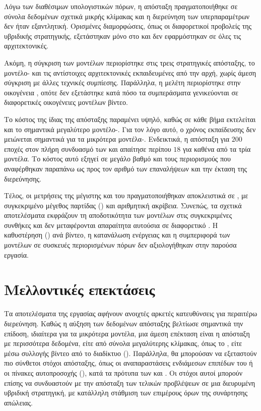 Λόγω των διαθέσιμων υπολογιστικών πόρων, η απόσταξη πραγματοποιήθηκε σε
σύνολα δεδομένων σχετικά μικρής κλίμακας και η διερεύνηση των
υπερπαραμέτρων δεν ήταν εξαντλητική. Ορισμένες διαμορφώσεις, όπως οι
διαφορετικοί προβολείς της υβριδικής στρατηγικής, εξετάστηκαν μόνο στο
 και δεν εφαρμόστηκαν σε όλες τις αρχιτεκτονικές.

Ακόμη, η σύγκριση των μοντέλων περιορίστηκε στις τρεις στρατηγικές
απόσταξης, το μοντέλο- και τις αντίστοιχες αρχιτεκτονικές
εκπαιδευμένες από την αρχή, χωρίς άμεση σύγκριση με άλλες τεχνικές
συμπίεσης. Παράλληλα, η μελέτη περιορίστηκε στην οικογένεια
, οπότε δεν εξετάστηκε κατά πόσο τα συμπεράσματα
γενικεύονται σε διαφορετικές οικογένειες μοντέλων βίντεο.

Το κόστος της ίδιας της απόσταξης παραμένει υψηλό, καθώς σε κάθε βήμα
εκτελείται και το σημαντικά μεγαλύτερο μοντέλο-. Για τον
λόγο αυτό, ο χρόνος εκπαίδευσης δεν μειώνεται σημαντικά για τα μικρότερα
μοντέλα-. Ενδεικτικά, η απόσταξη για \(200\) εποχές στον
πλήρη συνδυασμό των  και  απαίτησε περίπου
\(18\) για καθένα από τα τρία μοντέλα.
Το κόστος αυτό εξηγεί σε μεγάλο βαθμό και τους περιορισμούς που
αναφέρθηκαν παραπάνω ως προς τον αριθμό των επαναλήψεων και την
έκταση της διερεύνησης.

Τέλος, οι μετρήσεις της μέγιστης  και του 
πραγματοποιήθηκαν αποκλειστικά σε , με συγκεκριμένο
μέγεθος παρτίδας () και αριθμητική ακρίβεια. Συνεπώς, τα σχετικά
αποτελέσματα εκφράζουν τη αποδοτικότητα των μοντέλων στις
συγκεκριμένες συνθήκες και δεν μεταφέρονται απαραίτητα αυτούσια σε
διαφορετικό . Η καθυστέρηση () ανά βίντεο, η κατανάλωση ενέργειας και η
συμπεριφορά των μοντέλων σε συσκευές περιορισμένων πόρων δεν
αξιολογήθηκαν στην παρούσα εργασία.

\section{Μελλοντικές επεκτάσεις}
\label{sec:conclusions-future}

Τα αποτελέσματα της εργασίας αφήνουν ανοιχτές αρκετές κατευθύνσεις για
περαιτέρω διερεύνηση. Καθώς η αύξηση των δεδομένων απόσταξης βελτίωσε σημαντικά την επίδοση,
ιδιαίτερα για τα μικρότερα μοντέλα, μια άμεση επέκταση είναι η απόσταξη
με περισσότερα δεδομένα, είτε από σύνολα μεγαλύτερης κλίμακας, όπως το
 \cite{kay2017kinetics}, είτε μέσω συλλογής βίντεο από
το διαδίκτυο (). Παράλληλα, θα μπορούσαν να
εξεταστούν πιο σύνθετοι στόχοι απόσταξης, όπως οι αναπαραστάσεις
ενδιάμεσων επιπέδων του  ή οι πίνακες αυτοπροσοχής
(), κατά τα πρότυπα των 
\cite{yang2024vitkd} και  \cite{ren2023tinymim}. Οι
στόχοι αυτοί μπορούν επίσης να συνδυαστούν με την απόσταξη των τελικών
προβλέψεων σε μια διευρυμένη υβριδική στρατηγική, με κατάλληλη
στάθμιση των επιμέρους όρων της συνάρτησης απώλειας.

